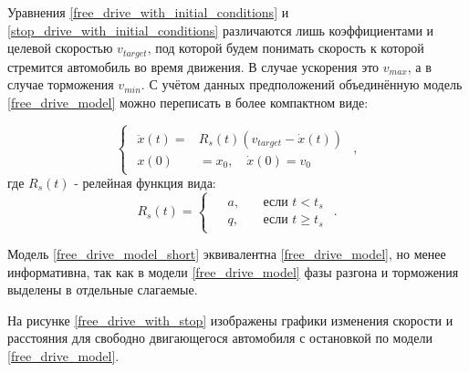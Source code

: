 \documentclass[12pt, a4paper]{extarticle}
\numberwithin{equation}{section}
\numberwithin{figure}{section}
\begin{document}
Уравнения \eqref{free_drive_with_initial_conditions} и  \eqref{stop_drive_with_initial_conditions} различаются лишь коэффициентами и целевой скоростью $v_{target}$, под которой будем понимать скорость к которой стремится автомобиль во время движения. В случае ускорения это $v_{max}$, а в случае торможения $v_{min}$. С учётом данных предположений объединённую модель \eqref{free_drive_model} можно переписать в более компактном виде:

\begin{equation} \label{free_drive_model_short}
\begin{cases}
\begin{split}
\ddot{x}(t) = &R_s(t) \left(v_{target}-\dot{x}(t) \right) \\
x(0)&=x_0, \quad \dot{x}(0)=v_{0}
\end{split}
\end{cases},
\end{equation}
где $R_s(t)$ - релейная функция вида:
\begin{equation*}
R_s(t)=
\begin{cases}
\begin{split}
&a, \quad&\text{если } t<t_{s} \\
&q, \quad&\text{если } t\geq t_{s}
\end{split}
\end{cases}.
\end{equation*}

Модель \eqref{free_drive_model_short} эквивалентна \eqref{free_drive_model}, но менее информативна, так как в модели \eqref{free_drive_model} фазы разгона и торможения выделены в отдельные слагаемые.

На рисунке \ref{free_drive_with_stop} изображены графики изменения скорости и расстояния для свободно двигающегося автомобиля с остановкой по модели \eqref{free_drive_model}.
\end{document}
